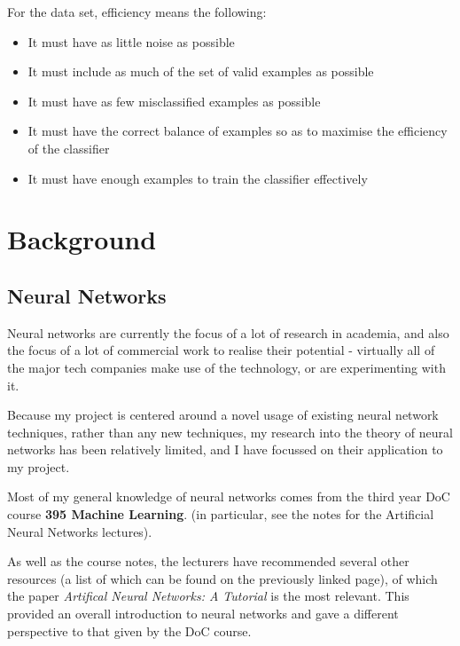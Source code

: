 \documentclass[a4paper]{article}
\begin{document}
For the data set, efficiency means the following:
\begin{itemize}
\item It must have as little noise as possible
\item It must include as much of the set of valid examples as possible
\item It must have as few misclassified examples as possible
\item It must have the correct balance of examples so as to maximise the efficiency of the classifier
\item It must have enough examples to train the classifier effectively
\end{itemize}

\newpage
\section{Background}

\subsection{Neural Networks}%

Neural networks are currently the focus of a lot of research in academia, and also the focus of a lot of commercial work to realise their potential - virtually all of the major tech companies make use of the technology, or are experimenting with it.

Because my project is centered around a novel usage of existing neural network techniques, rather than any new techniques, my research into the theory of neural networks has been relatively limited, and I have focussed on their application to my project.

Most of my general knowledge of neural networks comes from the third year DoC course \textbf{395 Machine Learning}\cite{bgref0}. (in particular, see the notes for the Artificial Neural Networks lectures).

As well as the course notes, the lecturers have recommended several other resources (a list of which can be found on the previously linked page), of which the paper \textit{Artifical Neural Networks: A Tutorial}\cite{bgref1} is the most relevant. This provided an overall introduction to neural networks and gave a different perspective to that given by the DoC course.
\end{document}
